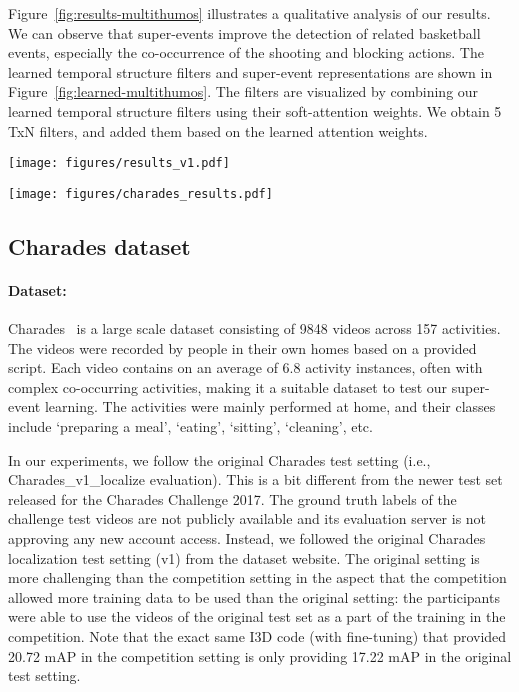 \documentclass[10pt,twocolumn,letterpaper]{article}
\begin{document}
Figure~\ref{fig:results-multithumos} illustrates a qualitative analysis of our results. We can observe that super-events improve the detection of related basketball events, especially the co-occurrence of the shooting and blocking actions. The learned temporal structure filters and super-event representations are shown in Figure~\ref{fig:learned-multithumos}. The filters are visualized by combining our learned temporal structure filters using their soft-attention weights. We obtain 5 TxN filters, and added them based on the learned attention weights.


\begin{figure*}
  \centering
    \texttt{[image: figures/results\_v1.pdf]}
      \caption{Results from a video in MultiTHUMOS. Super-events especially help the detection of the shooting and blocking events.}
      \label{fig:results-multithumos}
\end{figure*}

\begin{figure*}
  \centering
    \texttt{[image: figures/charades\_results.pdf]}
      \caption{Results from a video in Charades. Super-events improve the detection of related events such as taking, holding and eating a sandwich.}
      \label{fig:results-charades}
\end{figure*}

\subsection{Charades dataset}

\paragraph{Dataset:}
Charades~\cite{sigurdsson2016hollywood} is a large scale dataset consisting of 9848 videos across 157 activities. The videos were recorded by people in their own homes based on a provided script. Each video contains on an average of 6.8 activity instances, often with complex co-occurring activities, making it a suitable dataset to test our super-event learning. The activities were mainly performed at home, and their classes include `preparing a meal', `eating', `sitting', `cleaning', etc. 

In our experiments, we follow the original Charades test setting (i.e., Charades\_v1\_localize evaluation). This is a bit different from the newer test set released for the Charades Challenge 2017. The ground truth labels of the challenge test videos are not publicly available and its evaluation server is not approving any new account access. Instead, we followed the original Charades localization test setting (v1) from the dataset website. The original setting is more challenging than the competition setting in the aspect that the competition allowed more training data to be used than the original setting: the participants were able to use the videos of the original test set as a part of the training in the competition. Note that the exact same I3D code (with fine-tuning) that provided 20.72 mAP in the competition setting is only providing 17.22 mAP in the original test setting.
\end{document}

